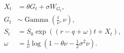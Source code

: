 \documentclass{equation-sheet}
\begin{document}
\begin{equation*}
\begin{aligned}
X_t &= \theta G_t + \sigma W_{G_t}, \\
G_t &\sim \operatorname{Gamma}\!\left(\frac{t}{\nu},\nu\right), \\
S_t &= S_0\exp\!\left((r-q+\omega)t+X_t\right), \\
\omega &= \frac{1}{\nu}
  \log\!\left(1-\theta\nu-\frac{1}{2}\sigma^2\nu\right).
\end{aligned}
\end{equation*}
\end{document}
